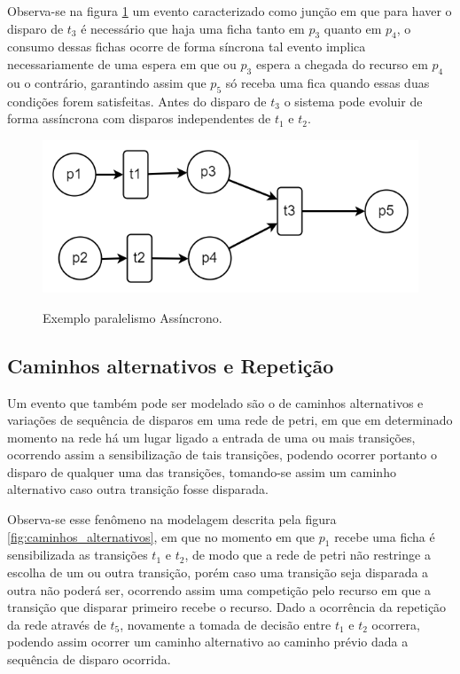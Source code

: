 Observa-se na figura \ref{fig:paralelismo_assincrono} um evento caracterizado como junção em que para haver o disparo de $t_3$ é necessário que haja uma ficha tanto em $p_3$ quanto em $p_4$, o consumo dessas fichas ocorre de forma síncrona tal evento implica necessariamente de uma espera em que ou $p_3$ espera a chegada do recurso em $p_4$ ou o contrário, garantindo assim que $p_5$ só receba uma fica quando essas duas condições forem satisfeitas. Antes do disparo de $t_3$ o sistema pode evoluir de forma assíncrona com disparos independentes de $t_1$ e $t_2$.

\begin{figure}[ht]
    \centering
    \caption{Exemplo paralelismo Assíncrono.}
    \includegraphics[scale=0.4]{figures/Petri/paralelismo_assincrono.png}
    \label{fig:paralelismo_assincrono}
\end{figure}


\subsection{Caminhos alternativos e Repetição}
Um evento que também pode ser modelado são o de caminhos alternativos e variações de sequência de disparos em uma rede de petri, em que em determinado momento na rede há um lugar ligado a entrada de uma ou mais transições, ocorrendo assim a sensibilização de tais transições, podendo ocorrer portanto o disparo de qualquer uma das transições, tomando-se assim um caminho alternativo caso outra transição fosse disparada.

Observa-se esse fenômeno na modelagem descrita pela figura \ref{fig:caminhos_alternativos}, em que no momento em que $p_1$ recebe uma ficha é sensibilizada as transições $t_1$ e $t_2$, de modo que a rede de petri não restringe a escolha de um ou outra transição, porém caso uma transição seja disparada a outra não poderá ser, ocorrendo assim uma competição pelo recurso em que a transição que disparar primeiro recebe o recurso. Dado a ocorrência da repetição da rede através de $t_5$, novamente a tomada de decisão entre $t_1$ e $t_2$ ocorrera, podendo assim ocorrer um caminho alternativo ao caminho prévio dada a sequência de disparo ocorrida.


